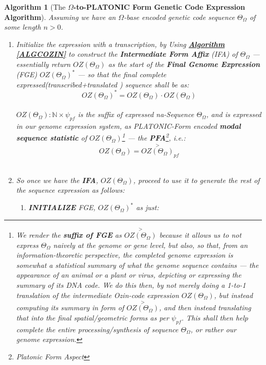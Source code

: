 \documentclass[a4paper, 18pt]{book} %
\newtheorem{alg}{Algorithm}
\begin{document}
\begin{appendices}
\begin{alg}[The \textbf{$\Omega$-to-PLATONIC Form Genetic Code Expression Algorithm}]
Assuming we have an $\Omega$-base encoded genetic code sequence $\Theta_\Omega$ of some length $n > 0$.

\begin{enumerate}
    \item{Initialize the expression with a transcription, by Using \textbf{\hyperref[ALGCOZIN]{Algorithm \ref{ALGCOZIN}}} to construct the \textbf{Intermediate Form Affix} (IFA) of $\Theta_\Omega$ --- essentially return $OZ(\Theta_\Omega)$ as the start of the \textbf{Final Genome Expression} (FGE) $\boxed{OZ(\Theta_\Omega)}^*$ --- so that the final complete expressed(transcribed+translated ) sequence shall be as:\\

\begin{equation}
\label{EQTRANSLGENSEQ_ORIG}
\boxed{OZ(\Theta_\Omega)}^* = OZ(\Theta_\Omega)\cdot\boxed{OZ(\Theta_\Omega)}
\end{equation}\\

$\boxed{OZ(\Theta_\Omega)}: \mathbb{N} \times \psi_{pf}$ is the suffix of expressed na-Sequence $\Theta_\Omega$, and is expressed in our genome expression system, as PLATONIC-Form encoded \textbf{modal sequence statistic} of $OZ(\Theta_\Omega)$\footnote{We render the \textbf{suffix of FGE} as $\overset{>}{OZ(\Theta_\Omega)}$ because it allows us to not express $\Theta_\Omega$ naively at the genome or gene level, but also, so that, from an information-theoretic perspective, the completed genome expression is somewhat a statistical summary of what the genome sequence contains --- the appearance of an animal or a plant or virus, depicting or expressing the summary of its DNA code. We do this then, by not merely doing a 1-to-1 translation of the intermediate Ozin-code expression $OZ(\Theta_\Omega)$, but instead computing its summary in form of $\overset{>}{OZ(\Theta_\Omega)}$, and then instead translating that into the final spatial/geometric forms as per $\psi_{pf}$. This shall then help complete the entire processing/synthesis of sequence $\Theta_\Omega$, or rather our genome expression.} --- the \textbf{PFA}\footnote{Platonic Form Aspect}, i.e.:\\

\begin{equation}
 \boxed{OZ(\Theta_\Omega)} = \boxed{\overset{>}{OZ(\Theta_\Omega)}}_{pf}
\end{equation}\\


}
\item{ So once we have the \textbf{IFA}, $OZ(\Theta_\Omega)$, proceed to use it to generate the rest of the sequence expression as follows: 
\begin{enumerate}
\item {\textbf{INITIALIZE} FGE, $\boxed{OZ(\Theta_\Omega)}^*$ as just:\\

}
\end{enumerate}}
\end{enumerate}
\end{alg}
\end{appendices}
\end{document}
